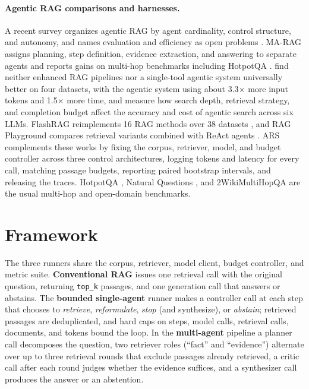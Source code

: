 \documentclass[11pt,a4paper]{article}
\begin{document}
\paragraph{Agentic RAG comparisons and harnesses.}
A recent survey organizes agentic RAG by agent cardinality, control
structure, and autonomy, and names evaluation and efficiency as open
problems \citep{singh2025agenticrag}.
MA-RAG assigns planning, step definition, evidence extraction, and answering
to separate agents and reports gains on multi-hop benchmarks including
HotpotQA \citep{nguyen2025marag}.
\citet{ferrazzi2026agenticrag} find neither enhanced RAG pipelines nor a
single-tool agentic system universally better on four datasets, with the
agentic system using about 3.3$\times$ more input tokens and 1.5$\times$ more
time, and \citet{mccleary2026bcas} measure how search depth, retrieval
strategy, and completion budget affect the accuracy and cost of agentic
search across six LLMs.
FlashRAG reimplements 16 RAG methods over 38 datasets \citep{jin2025flashrag},
and RAG Playground compares retrieval variants combined with ReAct agents
\citep{papadimitriou2024ragplayground}.
ARS complements these works by fixing the corpus, retriever, model, and
budget controller across three control architectures, logging tokens and
latency for every call, matching passage budgets, reporting paired bootstrap
intervals, and releasing the traces.
HotpotQA \citep{yang2018hotpotqa}, Natural Questions
\citep{kwiatkowski2019nq}, and 2WikiMultiHopQA \citep{ho2020twowiki} are the
usual multi-hop and open-domain benchmarks.

\section{Framework}
\label{sec:design}

The three runners share the corpus, retriever, model client, budget
controller, and metric suite.
\textbf{Conventional RAG} issues one retrieval call with the original
question, returning \texttt{top\_k} passages, and one generation call that
answers or abstains.
The \textbf{bounded single-agent} runner makes a controller call at each step
that chooses to \emph{retrieve}, \emph{reformulate}, \emph{stop} (and
synthesize), or \emph{abstain}; retrieved passages are deduplicated, and hard
caps on steps, model calls, retrieval calls, documents, and tokens bound the
loop.
In the \textbf{multi-agent} pipeline a planner call decomposes the question,
two retriever roles (``fact'' and ``evidence'') alternate over up to three
retrieval rounds that exclude passages already retrieved, a critic call after
each round judges whether the evidence suffices, and a synthesizer call
produces the answer or an abstention.
\end{document}

